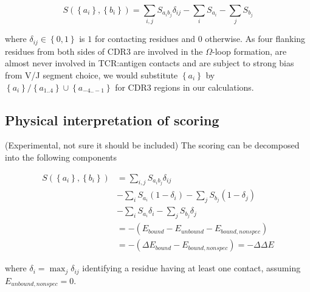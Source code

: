\documentclass{article}
\begin{document}
\begin{equation}
S\left(\left\{a_i\right\},\left\{b_i\right\}\right)=\sum_{i,j} S_{a_{i}b_{j}} \delta_{ij} - \sum_{i} S_{a_{i}} - \sum_{j} S_{b_{j}}
\end{equation}

where $\delta_{ij} \in \left\{0, 1\right\}$ is $1$ for contacting residues and $0$ otherwise. As four flanking residues from both sides of CDR3 are involved in the $\Omega$-loop formation, are almost never involved in TCR:antigen contacts and are subject to strong bias from V/J segment choice, we would substitute $\left\{a_i\right\}$ by $\left\{a_i\right\} / \left\{a_{1..4}\right\} \cup \left\{a_{-4..-1}\right\}$ for CDR3 regions in our calculations.

\subsection{Physical interpretation of scoring}

(Experimental, not sure it should be included) The scoring can be decomposed into the following components

\begin{align}
S\left(\left\{a_i\right\},\left\{b_i\right\}\right) &= \sum_{i,j} S_{a_{i}b_{j}} \delta_{ij} \\ &- \sum_{i} S_{a_{i}} \left(1 - \delta_i\right) - \sum_{j} S_{b_{j}} \left(1 - \delta_j\right) \\ &- \sum_{i} S_{a_{i}} \delta_i - \sum_{j} S_{b_{j}} \delta_j \\
 &= -\left(E_{bound} - E_{unbound} - E_{bound,nonspec}\right) \\
 &= -\left(\Delta E_{bound} - E_{bound,nonspec}\right) = -\Delta \Delta E
\end{align}

where $\delta_i = \max_{j} \delta_{ij}$ identifying a residue having at least one contact, assuming $E_{unbound,nonspec}=0$.
\end{document}
